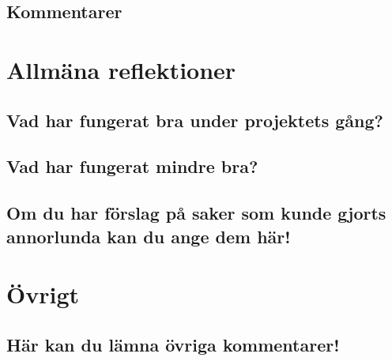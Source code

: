 \documentclass[10pt,a4paper]{article}
\begin{document}
\subsection*{Kommentarer}

\section*{Allmäna reflektioner}
\subsection*{Vad har fungerat bra under projektets gång?}
\subsection*{Vad har fungerat mindre bra?}
\subsection*{Om du har förslag på saker som kunde gjorts annorlunda kan du ange dem här!}

\section*{Övrigt}
\subsection*{Här kan du lämna övriga kommentarer!}
\end{document}
